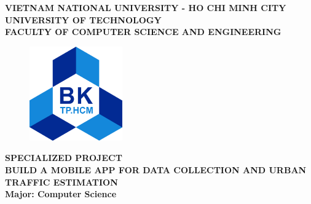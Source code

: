 \documentclass[a4paper]{article}
\begin{document}

\begin{titlepage}
\begin{center}
\large {\textbf{
VIETNAM NATIONAL UNIVERSITY - HO CHI MINH CITY \\
UNIVERSITY OF TECHNOLOGY \\
FACULTY OF COMPUTER SCIENCE AND ENGINEERING}}
\vspace{1cm}

\begin{figure}[ht]
    \centering
    \includegraphics[width=4cm]{assets/images/Trivia/hcmut.png}
\end{figure}

\begin{center}
\textbf{{\Large SPECIALIZED PROJECT}}\\
\vspace{1cm}
{\fontsize{20}{20}\selectfont %
\textbf{{BUILD A MOBILE APP FOR DATA COLLECTION AND URBAN TRAFFIC ESTIMATION}}\\
}
\vspace{1cm}
\textbf{{\Large Major: Computer Science}}
\end{center}

\vspace{1cm}


\end{center}
\end{titlepage}
\end{document}
